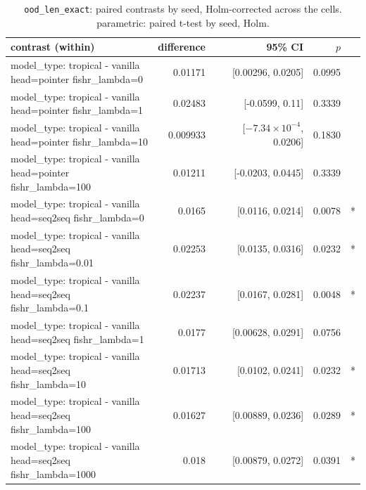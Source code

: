 \documentclass[10pt]{article}
\makeatletter
\newcommand{\stackcell}[1]{\begin{tabular}[t]{@{}l@{}}#1\end{tabular}}
\makeatother
\begin{document}
{\small
\begin{longtable}{lrrrl}
\caption{\texttt{ood\_len\_exact}: paired contrasts by seed, Holm-corrected across the cells. parametric: paired t-test by seed, Holm.}\label{tab:paired-ood_len_exact}\\
\toprule
contrast (within) & difference & 95\% CI & $p$ & \\
\midrule
\endhead
\stackcell{model\_type: tropical - vanilla\\\footnotesize head=pointer fishr\_lambda=0 } & 0.01171 & [0.00296, 0.0205] & 0.0995 & \\
\stackcell{model\_type: tropical - vanilla\\\footnotesize head=pointer fishr\_lambda=1 } & 0.02483 & [-0.0599, 0.11] & 0.3339 & \\
\stackcell{model\_type: tropical - vanilla\\\footnotesize head=pointer fishr\_lambda=10 } & 0.009933 & [$-7.34\times10^{-4}$, 0.0206] & 0.1830 & \\
\stackcell{model\_type: tropical - vanilla\\\footnotesize head=pointer fishr\_lambda=100 } & 0.01211 & [-0.0203, 0.0445] & 0.3339 & \\
\stackcell{model\_type: tropical - vanilla\\\footnotesize head=seq2seq fishr\_lambda=0 } & 0.0165 & [0.0116, 0.0214] & 0.0078 & *\\
\stackcell{model\_type: tropical - vanilla\\\footnotesize head=seq2seq fishr\_lambda=0.01 } & 0.02253 & [0.0135, 0.0316] & 0.0232 & *\\
\stackcell{model\_type: tropical - vanilla\\\footnotesize head=seq2seq fishr\_lambda=0.1 } & 0.02237 & [0.0167, 0.0281] & 0.0048 & *\\
\stackcell{model\_type: tropical - vanilla\\\footnotesize head=seq2seq fishr\_lambda=1 } & 0.0177 & [0.00628, 0.0291] & 0.0756 & \\
\stackcell{model\_type: tropical - vanilla\\\footnotesize head=seq2seq fishr\_lambda=10 } & 0.01713 & [0.0102, 0.0241] & 0.0232 & *\\
\stackcell{model\_type: tropical - vanilla\\\footnotesize head=seq2seq fishr\_lambda=100 } & 0.01627 & [0.00889, 0.0236] & 0.0289 & *\\
\stackcell{model\_type: tropical - vanilla\\\footnotesize head=seq2seq fishr\_lambda=1000 } & 0.018 & [0.00879, 0.0272] & 0.0391 & *\\

\end{longtable}}
\end{document}
